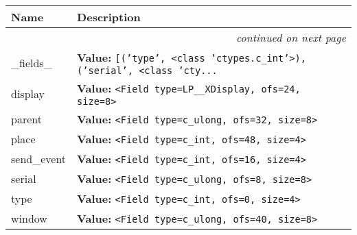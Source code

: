     \vspace{-1cm}
\hspace{\varindent}\begin{longtable}{|p{\varnamewidth}|p{\vardescrwidth}|l}
\cline{1-2}
\cline{1-2} \centering \textbf{Name} & \centering \textbf{Description}& \\
\cline{1-2}
\endhead\cline{1-2}\multicolumn{3}{r}{\small\textit{continued on next page}}\\\endfoot\cline{1-2}
\endlastfoot\raggedright \_\-f\-i\-e\-l\-d\-s\-\_\- & \raggedright \textbf{Value:} 
{\tt \texttt{[}\texttt{(}\texttt{'}\texttt{type}\texttt{'}\texttt{, }{\textless}class 'ctypes.c\_int'{\textgreater}\texttt{)}\texttt{, }\texttt{(}\texttt{'}\texttt{serial}\texttt{'}\texttt{, }{\textless}class 'cty\texttt{...}}&\\
\cline{1-2}
\raggedright d\-i\-s\-p\-l\-a\-y\- & \raggedright \textbf{Value:} 
{\tt {\textless}Field type=LP\_\_XDisplay, ofs=24, size=8{\textgreater}}&\\
\cline{1-2}
\raggedright p\-a\-r\-e\-n\-t\- & \raggedright \textbf{Value:} 
{\tt {\textless}Field type=c\_ulong, ofs=32, size=8{\textgreater}}&\\
\cline{1-2}
\raggedright p\-l\-a\-c\-e\- & \raggedright \textbf{Value:} 
{\tt {\textless}Field type=c\_int, ofs=48, size=4{\textgreater}}&\\
\cline{1-2}
\raggedright s\-e\-n\-d\-\_\-e\-v\-e\-n\-t\- & \raggedright \textbf{Value:} 
{\tt {\textless}Field type=c\_int, ofs=16, size=4{\textgreater}}&\\
\cline{1-2}
\raggedright s\-e\-r\-i\-a\-l\- & \raggedright \textbf{Value:} 
{\tt {\textless}Field type=c\_ulong, ofs=8, size=8{\textgreater}}&\\
\cline{1-2}
\raggedright t\-y\-p\-e\- & \raggedright \textbf{Value:} 
{\tt {\textless}Field type=c\_int, ofs=0, size=4{\textgreater}}&\\
\cline{1-2}
\raggedright w\-i\-n\-d\-o\-w\- & \raggedright \textbf{Value:} 
{\tt {\textless}Field type=c\_ulong, ofs=40, size=8{\textgreater}}&\\
\cline{1-2}
\end{longtable}



